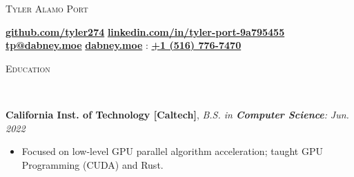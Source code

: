 \documentclass[8pt]{article}
\newenvironment{changemargin}[2]{%
  \begin{list}{}{%
    \setlength{\topsep}{0pt}%
    \setlength{\leftmargin}{#1}%
    \setlength{\rightmargin}{#2}%
    \setlength{\listparindent}{\parindent}%
    \setlength{\itemindent}{\parindent}%
    \setlength{\parsep}{0pt}%
    \setlength{\itemsep}{-2pt}%
  }%
  \item[]}{\end{list}
}
\newcommand{\lineover}{
	\begin{changemargin}{-0.05in}{-0.05in}
		\vspace*{-10pt}
		\hrulefill \\
		\vspace*{-4pt}
	\end{changemargin}
}
\newcommand{\header}[1]{
	\begin{changemargin}{-0.5in}{-0.5in}
		\scshape{#1}\\
  	\lineover
	\end{changemargin}
}
\newenvironment{body} {
	\vspace*{-10pt}
	\begin{changemargin}{-0.25in}{-0.5in}
  }	
	{\end{changemargin}
}
\begin{document}
\begin{center}
	\vspace*{-48pt}
	{\Large \scshape Tyler Alamo Port}
\end{center}
\vspace*{-4pt}
\hspace{7.25mm} \faGithub \hspace{0.25mm} \textbf{\href{https://github.com/tyler274}{github.com/tyler274}} \hspace{7.25mm} \faLinkedinSquare \hspace{0.25mm} \textbf{\href{https://linkedin.com/in/tyler-port-9a795455/}{linkedin.com/in/tyler-port-9a795455}} \\
\vspace*{1pt}  \hspace{12.25mm} \faEnvelope \hspace{0.1mm} \textbf{\href{mailto:tp@dabney.moe}{tp@dabney.moe}} \hspace{8.25mm} \faGlobe \hspace{0.1mm} \textbf{\href{https://dabney.moe}{dabney.moe}} \hspace{8.25mm} \faMobile : \textbf{\href{tel:+15167767470}{+1 (516) 776-7470}}\\
\vspace*{-11pt}
\smallskip

\header{Education}
\begin{body}
	\vspace{10pt}
	\textbf{California Inst. of Technology [Caltech]}{}, \emph{B.S. in
	\textbf{Computer Science}:} \hfill \emph{Jun. 2022}{} \\
	\vspace{-5pt}
	\begin{itemize} \itemsep -2pt
		\item Focused on low-level GPU parallel algorithm acceleration; taught GPU Programming (CUDA) and Rust.
	\end{itemize}
\end{body}

\smallskip
\vspace*{-11pt}
\end{document}

